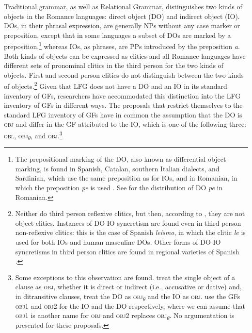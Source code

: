 \documentclass[output=paper,hidelinks]{langscibook}
\begin{document}
Traditional grammar, as well as Relational Grammar, distinguishes two kinds of objects in the Romance languages: direct object (DO) and indirect object (IO). DOs, in their phrasal expression, are generally NPs without any case marker or preposition, except that in some languages a subset of DOs are marked by a preposition,\footnote{\label{fn:Romance:15}The prepositional marking of the DO, also known as differential object marking, is found in Spanish, Catalan, southern Italian dialects, and Sardinian, which use the same preposition as for IOs, and in Romanian, in which the preposition \textit{pe} is used \citep[920--921]{DragomirescuNicolae2016}. See \citet{BarbuToivonen2018} for the distribution of DO \textit{pe} in Romanian.} whereas IOs, as phrases, are PPs introduced by the preposition \textit{a}. Both kinds of objects can be expressed as clitics and all Romance languages have different sets of pronominal clitics in the third person for the two kinds of objects. First and second person clitics do not distinguish between the two kinds of objects.\footnote{\label{fn:Romance:16}Neither do third person reflexive clitics, but then, according to , they are not object clitics. Instances of DO-IO syncretism are found even in third person non-reflexive clitics: this is the case of Spanish \textit{leísmo}, in which the clitic \textit{le} is used for both IOs and human masculine DOs. Other forms of DO-IO syncretisms in third person clitics are found in regional varieties of Spanish \citep[398]{TutenPatoSchwarzwald2016}.} Given that LFG does not have a DO and an IO in its standard inventory of GFs, researchers have accommodated this distinction into the LFG inventory of GFs in different ways. The proposals that restrict themselves to the standard LFG inventory of GFs have in common the assumption that the DO is \textsc{obj} and differ in the GF attributed to the IO, which is one of the following three: \textsc{obl}, \textsc{obj}\textsubscript{$\theta$}, and \textsc{obj}.\footnote{Some exceptions to this observation are found. \citet[344--349]{LuisOtoguro2004} treat the single object of a clause as \textsc{obj}, whether it is direct or indirect (i.e., accusative or dative) and, in ditransitive clauses, treat the DO as \textsc{obj}\textsubscript{$\theta$} and the IO as \textsc{obj}. \citet{LuisSpencer2005} use the GFs \textsc{obj1} and \textsc{obj2} for the IO and the DO respectively, where we can assume that \textsc{obj1} is another name for \textsc{obj} and \textsc{obj2} replaces \textsc{obj}\textsubscript{$\theta$}. No argumentation is presented for these proposals.}
\end{document}
